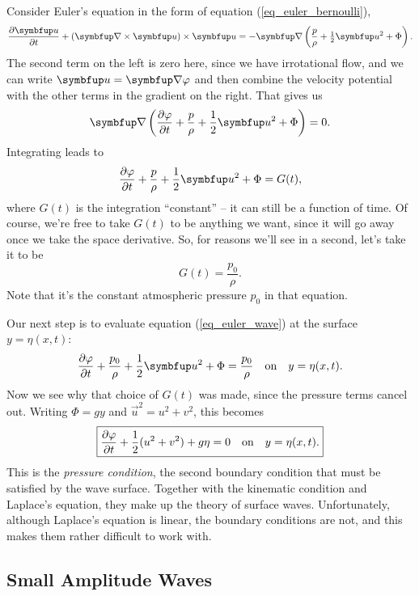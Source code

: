Consider Euler's equation in the form of equation (\ref{eq_euler_bernoulli}),
\[
\frac{\partial \uu}{\partial t} + (\curl \uu ) \times \uu = -\grad \left( \frac{p}{\rho} + \tfrac{1}{2} \uu^2 + \Phi \right).
\]
The second term on the left is zero here, since we have irrotational flow, and we can write $\vec{u} = \grad \varphi$ and then combine the velocity potential with the other terms in the gradient on the right.  That gives us
\[
\grad \left( \dfdx{\varphi}{t} + \frac{p}{\rho} + \frac{1}{2} \vec{u}^2 + \Phi \right) = 0.
\]
Integrating leads to
\begin{equation}
\label{eq_euler_wave}
\dfdx{\varphi}{t} + \frac{p}{\rho} + \frac{1}{2} \vec{u}^2 + \Phi = G(t),
\end{equation}
where $G(t)$ is the integration ``constant'' -- it can still be a function of time.  Of course, we're free to take $G(t)$ to be anything we want, since it will go away once we take the space derivative. So, for reasons we'll see in a second, let's take it to be
\begin{equation}
G(t) = \frac{p_0}{\rho}.
\end{equation}
Note that it's the constant atmospheric pressure $p_0$ in that equation.

Our next step is to evaluate equation (\ref{eq_euler_wave}) at the surface $y = \eta(x, t)$:
\begin{equation}
\label{eq_pressure_surface}
\dfdx{\varphi}{t} + \frac{p_0}{\rho} + \frac{1}{2} \vec{u}^2 + \Phi = \frac{p_0}{\rho} \quad \text{on} \quad y = \eta(x, t).
\end{equation}
Now we see why that choice of $G(t)$ was made, since the pressure terms cancel out.  Writing $\Phi = gy$ and $\vec{u}^2 = u^2 + v^2$, this becomes
\begin{equation}
\label{eq_pressure_cond}
\boxed{
\frac{\partial {\varphi}}{\partial {t}} +  \frac{1}{2}(u^2 + v^2) + g\eta = 0 \quad \text{on} \quad y = \eta(x, t).
}
\end{equation}
This is the \emph{pressure condition}, the second boundary condition that must be satisfied by the wave surface.  Together with the kinematic condition and Laplace's equation, they make up the theory of surface waves.  Unfortunately, although Laplace's equation is linear, the boundary conditions are not, and this makes them rather difficult to work with.  



\subsection{Small Amplitude Waves}

